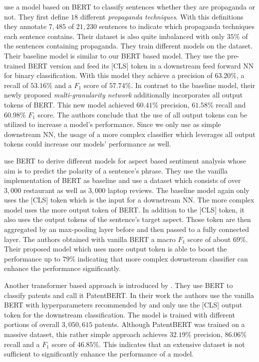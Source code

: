 \Textcite{Martino:2019} use a model based on \ac{BERT} to classify sentences whether they are propaganda or not.
They first define $18$ different \textit{propaganda techniques}.
With this definitions they annotate $7,485$ of $21,230$ sentences to indicate which propaganda techniques each sentence contains.
Their dataset is also quite imbalanced with only $35\%$ of the sentences containing propaganda.
They train different models on the dataset.
Their baseline model is similar to our \ac{BERT} based model.
They use the pre-trained \ac{BERT} version and feed its [CLS] token in a downstream feed forward \ac{NN} for binary classification.
With this model they achieve a precision of $63.20\%$, a recall of $53.16\%$ and a $F_1$ score of $57.74\%$.
In contrast to the baseline model, their newly proposed \textit{multi-granularity network} additionally incorporates all output tokens of \ac{BERT}.
This new model achieved $60.41\%$ precision, $61.58\%$ recall and $60.98\%$ $F_1$ score.
The authors conclude that the use of all output tokens can be utilized to increase a model's performance.
Since we only use as simple downstream \ac{NN}, the usage of a more complex classifier which leverages all output tokens could increase our models' performance as well.

\Textcite{Gao:2019} use \ac{BERT} to derive different models for aspect based sentiment analysis whose aim is to predict the polarity of a sentence's phrase.
They use the vanilla implementation of \ac{BERT} as baseline and use a dataset which consists of over $3,000$ restaurant as well as $3,000$ laptop reviews.
The baseline model again only uses the [CLS] token which is the input for a downstream \ac{NN}.
The more complex model uses the more output token of \ac{BERT}.
In addition to the [CLS] token, it also uses the output tokens of the sentence's target aspect.
Those token are then aggregated by an max-pooling layer before and then passed to a fully connected layer.
The authors obtained with vanilla \ac{BERT} a macro $F_1$ score of about $69\%$.
Their proposed model which uses more output token is able to boost the performance up to $79\%$ indicating that more complex downstream classifier can enhance the performance significantly.

Another transformer based approach is introduced by \textcite{Lee:2019}.
They use \ac{BERT} to classify patents and call it PatentBERT.
In their work the authors use the vanilla \ac{BERT} with hyperparameters recommended by \textcite{Devlin:2018} and only use the [CLS] output token for the downstream classification.
The model is trained with different portions of overall $3,050,615$ patents.
Although PatentBERT was trained on a massive dataset, this rather simple approach achieves $32.19\%$ precision, $86.06\%$ recall and a $F_1$ score of $46.85\%$.
This indicates that an extensive dataset is not sufficient to significantly enhance the performance of a model.

